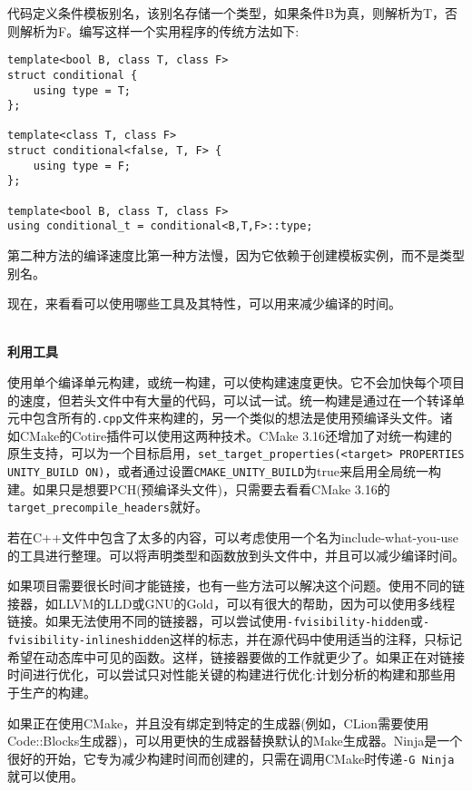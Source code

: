 代码定义条件模板别名，该别名存储一个类型，如果条件B为真，则解析为T，否则解析为F。编写这样一个实用程序的传统方法如下:

\begin{lstlisting}[style=styleCXX]
template<bool B, class T, class F>
struct conditional {
	using type = T;
};

template<class T, class F>
struct conditional<false, T, F> {
	using type = F;
};

template<bool B, class T, class F>
using conditional_t = conditional<B,T,F>::type;
\end{lstlisting}

第二种方法的编译速度比第一种方法慢，因为它依赖于创建模板实例，而不是类型别名。

现在，来看看可以使用哪些工具及其特性，可以用来减少编译的时间。

\hspace*{\fill} \\ %
\noindent
\textbf{利用工具}

使用单个编译单元构建，或统一构建，可以使构建速度更快。它不会加快每个项目的速度，但若头文件中有大量的代码，可以试一试。统一构建是通过在一个转译单元中包含所有的\texttt{.cpp}文件来构建的，另一个类似的想法是使用预编译头文件。诸如CMake的Cotire插件可以使用这两种技术。CMake 3.16还增加了对统一构建的原生支持，可以为一个目标启用，\texttt{set\_target\_properties(<target> PROPERTIES UNITY\_BUILD ON)}，或者通过设置\texttt{CMAKE\_UNITY\_BUILD}为true来启用全局统一构建。如果只是想要PCH(预编译头文件)，只需要去看看CMake 3.16的\texttt{target\_precompile\_headers}就好。

\begin{tcolorbox}[colback=webgreen!5!white,colframe=webgreen!75!black, title=TIP]
\hspace*{0.7cm}若在C++文件中包含了太多的内容，可以考虑使用一个名为include-what-you-use的工具进行整理。可以将声明类型和函数放到头文件中，并且可以减少编译时间。
\end{tcolorbox}

如果项目需要很长时间才能链接，也有一些方法可以解决这个问题。使用不同的链接器，如LLVM的LLD或GNU的Gold，可以有很大的帮助，因为可以使用多线程链接。如果无法使用不同的链接器，可以尝试使用\texttt{-fvisibility-hidden}或\texttt{-fvisibility-inlineshidden}这样的标志，并在源代码中使用适当的注释，只标记希望在动态库中可见的函数。这样，链接器要做的工作就更少了。如果正在对链接时间进行优化，可以尝试只对性能关键的构建进行优化:计划分析的构建和那些用于生产的构建。

如果正在使用CMake，并且没有绑定到特定的生成器(例如，CLion需要使用Code::Blocks生成器)，可以用更快的生成器替换默认的Make生成器。Ninja是一个很好的开始，它专为减少构建时间而创建的，只需在调用CMake时传递\texttt{-G Ninja}就可以使用。

